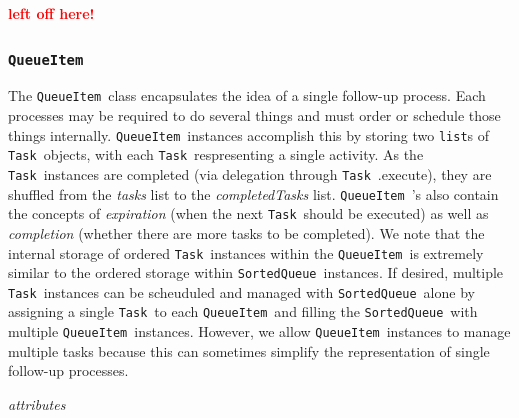\documentclass{article}
\newcommand{\FIXME}[1]{\textcolor{red}{\textbf{#1}}}
\newcommand{\SortedQueue}{\texttt{SortedQueue}~}
\newcommand{\QueueItem}{\texttt{QueueItem}~}
\newcommand{\Task}{\texttt{Task}~}
\begin{document}

\newpage

\FIXME{left off here!}

\newpage

\subsubsection{\QueueItem}
\label{sec: QueueItem}

The \QueueItem class encapsulates the idea of a single follow-up process.
Each processes may be required to do several things and must order or schedule those things internally.
\QueueItem instances accomplish this by storing two \texttt{list}s of \Task objects, with each \Task respresenting a single activity.
As the \Task instances are completed (via delegation through \Task.execute), they are shuffled from the \textit{tasks} list to the \textit{completedTasks} list.
\QueueItem's also contain the concepts of \textit{expiration} (when the next \Task should be executed) as well as \textit{completion} (whether there are more tasks to be completed).
We note that the internal storage of ordered \Task instances within the \QueueItem is extremely similar to the ordered storage within \SortedQueue instances.
If desired, multiple \Task instances can be scheuduled and managed with \SortedQueue alone by assigning a single \Task to each \QueueItem and filling the \SortedQueue with multiple \QueueItem instances.
However, we allow \QueueItem instances to manage multiple tasks because this can sometimes simplify the representation of single follow-up processes.

\vspace{0.5cm}
\noindent
\textit{attributes}
\end{document}
